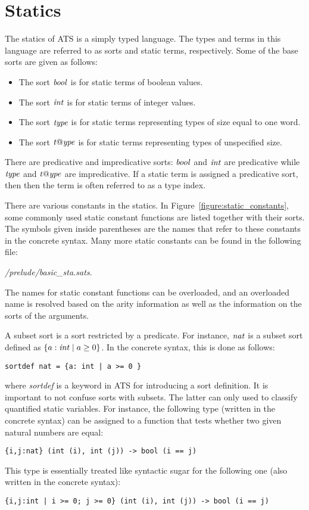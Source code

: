 \section{Statics}
The statics of ATS is a simply typed language. The types and terms in this
language are referred to as sorts and static terms, respectively. Some of
the base sorts are given as follows:
\begin{itemize}
\item The sort ${\it bool}$ is for static terms of boolean values.
\item The sort ${\it int}$ is for static terms of integer values.
\item The sort ${\it type}$ is for static terms representing types of size
equal to one word.
\item The sort ${\it t@ype}$ is for static terms representing types of
unspecified size.
\end{itemize}
There are predicative and impredicative sorts:
${\it bool}$ and ${\it int}$ are predicative while ${\it type}$ and ${\it t@ype}$ are
impredicative. If a static term is assigned a predicative sort, then
then the term is often referred to as a type index.

There are various constants in the statics.  In
Figure~\ref{figure:static_constants}, some commonly used static constant
functions are listed together with their sorts.  The symbols given inside
parentheses are the names that refer to these constants in the concrete
syntax. Many more static constants can be found in the following file:
\begin{center}
{\it\ATSHOME/prelude/basic\_sta.sats}.
\end{center}
The names for static constant functions can be overloaded, and an
overloaded name is resolved based on the arity information as well as the
information on the sorts of the arguments.

A subset sort is a sort restricted by a predicate. For instance, ${\it nat}$ is
a subset sort defined as $\{a:{\it int}\mid a\geq 0\}$. In the concrete syntax,
this is done as follows:
\begin{verbatim}
sortdef nat = {a: int | a >= 0 }
\end{verbatim}
where {\it sortdef} is a keyword in ATS for introducing a sort definition.
It is important to not confuse sorts with subsets. The latter can only used
to classify quantified static variables.  For instance, the following type
(written in the concrete syntax)
can be assigned to a function that tests whether two given natural numbers
are equal:
\begin{verbatim}
{i,j:nat} (int (i), int (j)) -> bool (i == j)
\end{verbatim}
This type is essentially treated like syntactic sugar for the following
one (also written in the concrete syntax):
\begin{verbatim}
{i,j:int | i >= 0; j >= 0} (int (i), int (j)) -> bool (i == j)
\end{verbatim}


